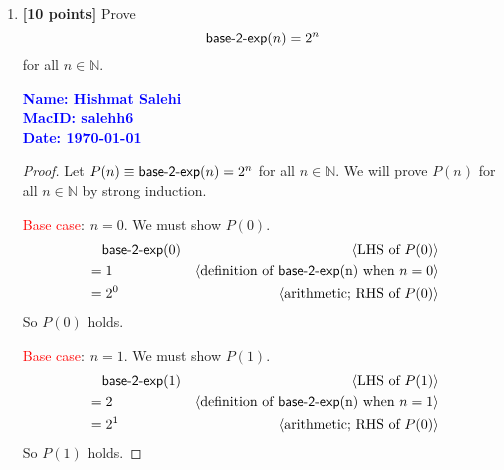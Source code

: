 \documentclass[11pt,fleqn]{article}
\newcommand{\mname}[1]{\mbox{\sf #1}}
\newcommand{\pnote}[1]{{\langle \text{#1} \rangle}}
\begin{document}
\begin{enumerate}
\begin{proof}
\medskip

Therefore, $P(n)$ holds for all $n \in \mathbb{N}$ by weak induction.
\end{proof}

  \bigskip

  \item \textbf{[10 points]} Prove \[\mname{base-2-exp}(n) = 2^n\] for
    all $n \in \mathbb{N}$.

  \bigskip

  \textcolor{blue}{\textbf{Name: Hishmat Salehi \\ MacID: salehh6 \\ Date: \today}}

\begin{proof}
Let $P(n) \equiv \mname{base-2-exp}(n) = {2^n}$  for all $n \in \mathbb{N}$.  We will prove $P(n)$
for all $n \in \mathbb{N}$ by strong induction.

\medskip

\textcolor{red}{Base case}: $n = 0$.  We must show $P(0)$.
\begin{align*}
  &\phantom{{}=} \mname{base-2-exp}(0) & \pnote{LHS of $P(0)$}\\
  &= 1          & \pnote{definition of \mname{base-2-exp}(n) when $n = 0$}\\
  &= {2}^0    & \pnote{arithmetic; RHS of $P(0)$}
\end{align*}
So $P(0)$ holds.

\medskip

\textcolor{red}{Base case}: $n = 1$.  We must show $P(1)$.
\begin{align*}
  &\phantom{{}=} \mname{base-2-exp}(1) & \pnote{LHS of $P(1)$}\\
  &= 2         & \pnote{definition of \mname{base-2-exp}(n) when $n = 1$}\\
  &= {2}^1    & \pnote{arithmetic; RHS of $P(0)$}
\end{align*}
So $P(1)$ holds.

\medskip


\end{proof}
\end{enumerate}
\end{document}
